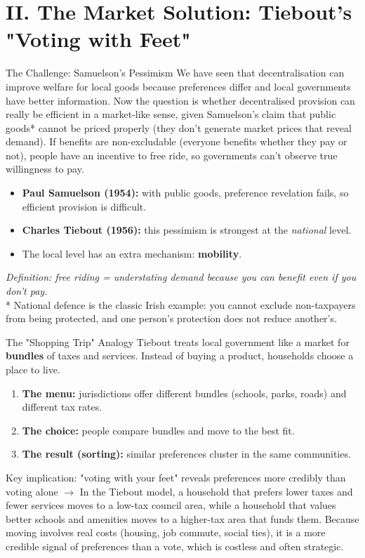 \documentclass[10pt]{beamer}
\begin{document}
\section{II. The Market Solution: Tiebout's "Voting with Feet"}


\begin{frame}{The Challenge: Samuelson's Pessimism}
We have seen that decentralisation can improve welfare for local goods because preferences differ and local governments have better information. Now the question is whether decentralised provision can really be efficient in a market-like sense, given Samuelson’s claim that public goods* cannot be priced properly (they don't generate market prices that reveal demand).
If benefits are non-excludable (everyone benefits whether they pay or not), people have an incentive to free ride, so governments can’t observe true willingness to pay.

\begin{itemize}
\item \textbf{Paul Samuelson (1954):} with public goods, preference revelation fails, so efficient provision is difficult.
\item \textbf{Charles Tiebout (1956):} this pessimism is strongest at the \textit{national} level.
\item The local level has an extra mechanism: \textbf{mobility}.
\end{itemize}


\footnotesize
\textit{Definition: free riding = understating demand because you can benefit even if you don't pay.}\\
* National defence is the classic Irish example: you cannot exclude non-taxpayers from being protected, and one person’s protection does not reduce another’s.
\end{frame}

\begin{frame}{The "Shopping Trip" Analogy}
Tiebout treats local government like a market for \textbf{bundles} of taxes and services.
Instead of buying a product, households choose a place to live.

\begin{enumerate}
\item \textbf{The menu:} jurisdictions offer different bundles (schools, parks, roads) and different tax rates.
\item \textbf{The choice:} people compare bundles and move to the best fit.
\item \textbf{The result (sorting):} similar preferences cluster in the same communities.
\end{enumerate}

\vspace{0.15cm}
\alert{\footnotesize Key implication: "voting with your feet" reveals preferences more credibly than voting alone $\rightarrow$ In the Tiebout model, a household that prefers lower taxes and fewer services moves to a low-tax council area, while a household that values better schools and amenities moves to a higher-tax area that funds them. Because moving involves real costs (housing, job commute, social ties), it is a more credible signal of preferences than a vote, which is costless and often strategic.}
\end{frame}
\end{document}
